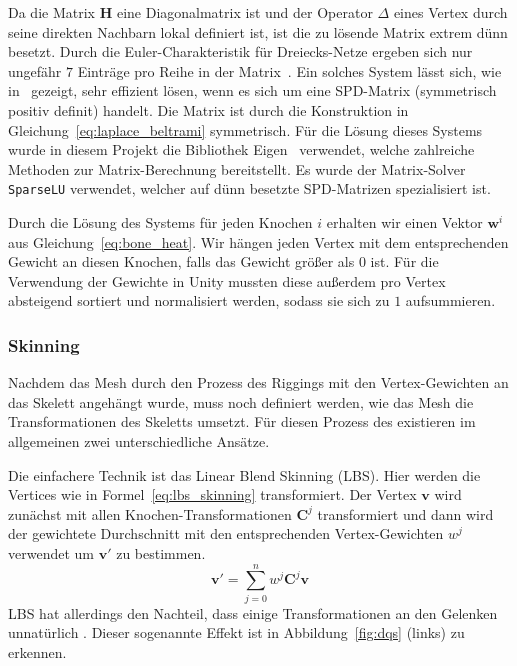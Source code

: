 Da die Matrix $\textbf{H}$ eine Diagonalmatrix ist und der Operator $\Delta$ eines Vertex durch seine direkten Nachbarn lokal definiert ist, ist die zu lösende Matrix extrem dünn besetzt. Durch die Euler-Charakteristik für Dreiecks-Netze ergeben sich nur ungefähr $7$ Einträge pro Reihe in der Matrix~\cite{spd_solver_paper}. Ein solches System lässt sich, wie in~\cite{spd_solver_paper} gezeigt, sehr effizient lösen, wenn es sich um eine SPD-Matrix (symmetrisch positiv definit) handelt. Die Matrix ist durch die Konstruktion in Gleichung~\ref{eq:laplace_beltrami} symmetrisch. Für die Lösung dieses Systems wurde in diesem Projekt die Bibliothek Eigen~\cite{eigen} verwendet, welche zahlreiche Methoden zur Matrix-Berechnung bereitstellt. Es wurde der Matrix-Solver \texttt{SparseLU} verwendet, welcher auf dünn besetzte SPD-Matrizen spezialisiert ist.

Durch die Lösung des Systems für jeden Knochen $i$ erhalten wir einen Vektor $\textbf{w}^i$ aus Gleichung~\ref{eq:bone_heat}. Wir hängen jeden Vertex mit dem entsprechenden Gewicht an diesen Knochen, falls das Gewicht größer als $0$ ist. Für die Verwendung der Gewichte in Unity mussten diese außerdem pro Vertex absteigend sortiert und normalisiert werden, sodass sie sich zu $1$ aufsummieren.

\subsubsection{Skinning}\label{skinning}
Nachdem das Mesh durch den Prozess des Riggings mit den Vertex-Gewichten an das Skelett angehängt wurde, muss noch definiert werden, wie das Mesh die Transformationen des Skeletts umsetzt. Für diesen Prozess des \grqq{} existieren im allgemeinen zwei unterschiedliche Ansätze.

Die einfachere Technik ist das Linear Blend Skinning (LBS). Hier werden die Vertices wie in Formel~\ref{eq:lbs_skinning} transformiert. Der Vertex $\textbf{v}$ wird zunächst mit allen Knochen-Transformationen $\textbf{C}^j$ transformiert und dann wird der gewichtete Durchschnitt mit den entsprechenden Vertex-Gewichten $w^j$ verwendet um $\textbf{v$'$}$ zu bestimmen.
\begin{equation}
	\label{eq:lbs_skinning}
	\textbf{v$'$} = \sum_{j=0}^n w^{j} \textbf{C}^j \textbf{v}
\end{equation}
LBS hat allerdings den Nachteil, dass einige Transformationen an den Gelenken unnatürlich \grqq{}. Dieser sogenannte \grqq{} Effekt ist in Abbildung~\ref{fig:dqs} (links) zu erkennen.

